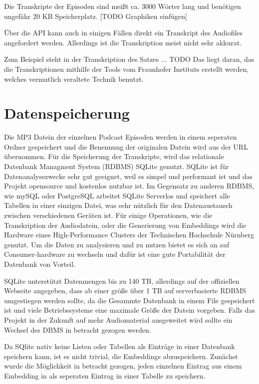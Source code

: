 Die Transkripte der Episoden sind meißt ca. 3000 Wörter lang und benötigen ungefähr 20 KB Speicherplatz. [TODO Graphiken einfügen]





Über die API kann auch in einigen Fällen direkt ein Transkript des Audiofiles angefordert werden. 
Allerdings ist die Transkription meist nicht sehr akkurat.


Zum Beispiel steht in der Transkription des Satzes ... TODO
Das liegt daran, das die Transkriptionen mithilfe der Tools vom Fraunhofer Instituts erstellt werden, welches vermutlich veraltete Technik benutzt.

\section{Datenspeicherung}

Die MP3 Datein der einzelnen Podcast Episoden werden in einem seperaten Ordner gespeichert und die Benennung der originalen Datein wird aus der URL übernommen.
Für die Speicherung der Transkripte, wird das relationale Datenbank Managment System (RDBMS) SQLite  genutzt.
SQLite ist für Datenanalysezwecke sehr gut geeignet, weil es simpel und performant ist und das Projekt opensource und kostenlos nutzbar ist.
Im Gegensatz zu anderen RDBMS, wie mySQL oder PostgreSQL arbeitet SQLite Serverlos und speichert alle Tabellen in einer einzigen Datei, was sehr nützlich für den Datenaustausch zwischen verschiedenen Geräten ist.
Für einige Operationen, wie die Transkription der Audiodatein, oder die Generierung von Embeddings wird die Hardware eines High-Performance Clusters der Technischen Hochschule Nürnberg genutzt. 
Um die Daten zu analysieren und zu nutzen bietet es sich an auf Consumer-hardware zu wechseln und dafür ist eine gute Portabilität der Datenbank von Vorteil.

SQLite unterstützt Datenmengen bis zu 140 TB, allerdings auf der offiziellen Webseite angegeben, dass ab einer größe über 1 TB auf serverbasierte RDBMS umgestiegen werden sollte, da die Gesammte Datenbank in einem File gespeichert ist und viele Betriebssysteme eine maximale Größe der Datein vorgeben.
Falls das Projekt in der Zukunft auf mehr Audiomaterial ausgeweitet wird sollte ein Wechsel des DBMS in betracht gezogen werden.

Da SQlite nativ keine Listen oder Tabellen als Einträge in einer Datenbank speichern kann, ist es nicht trivial, die Embeddings abzuspeichern.
Zunächst wurde die Möglichkeit in betracht gezogen, jeden einzelnen Eintrag aus einem Embedding in als seperaten Eintrag in einer Tabelle zu speichern. 

